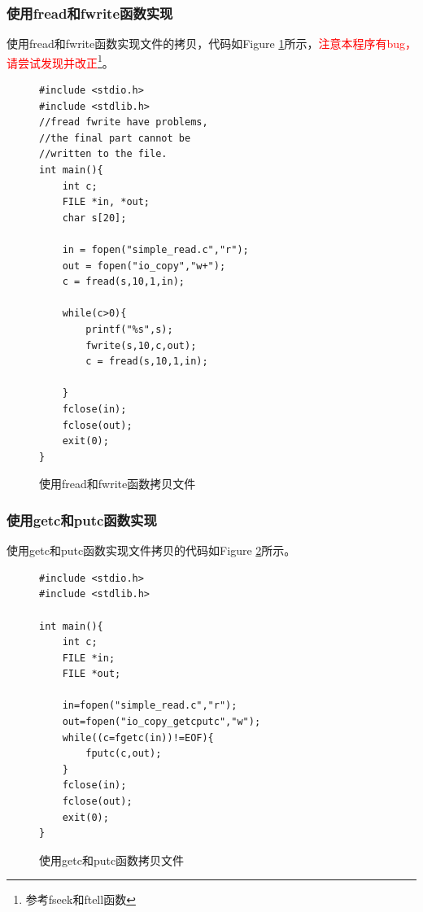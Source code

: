 \subsubsection{使用fread和fwrite函数实现}
使用fread和fwrite函数实现文件的拷贝，代码如Figure \ref{frdfwt}所示，\textcolor{red}{注意本程序有bug，请尝试发现并改正\footnote{参考fseek和ftell函数}}。
\begin{figure}
\begin{lstlisting}
#include <stdio.h>
#include <stdlib.h>
//fread fwrite have problems,
//the final part cannot be 
//written to the file.
int main(){
	int c;
	FILE *in, *out;
	char s[20];

	in = fopen("simple_read.c","r");
	out = fopen("io_copy","w+");
	c = fread(s,10,1,in);
	
	while(c>0){
		printf("%s",s);
		fwrite(s,10,c,out);
		c = fread(s,10,1,in);
		
	}
	fclose(in);
	fclose(out);
	exit(0);
}

\end{lstlisting}
\caption{使用fread和fwrite函数拷贝文件}
\label{frdfwt}
\end{figure}
\subsubsection{使用getc和putc函数实现}
使用getc和putc函数实现文件拷贝的代码如Figure \ref{getputc}所示。
\begin{figure}
\begin{lstlisting}
#include <stdio.h>
#include <stdlib.h>

int main(){
	int c;
	FILE *in;
	FILE *out;

	in=fopen("simple_read.c","r");
	out=fopen("io_copy_getcputc","w");
	while((c=fgetc(in))!=EOF){
		fputc(c,out);
	}
	fclose(in);
	fclose(out);
	exit(0);
}
\end{lstlisting}
\caption{使用getc和putc函数拷贝文件}
\label{getputc}
\end{figure}